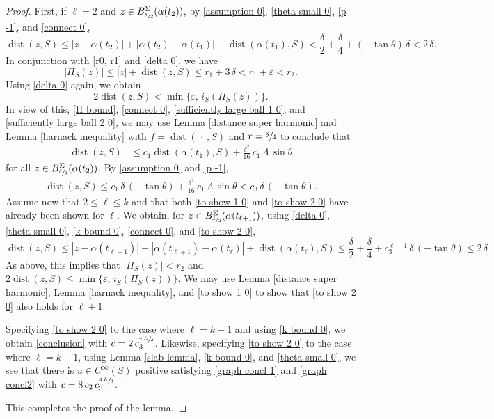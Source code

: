 \documentclass[11pt]{amsart}
\begin{document}
\begin{proof}
		First, if $\ell=2$ and $z\in B^\Sigma_{\sfrac{\delta}{2}}(\alpha(t_2))$, by  \eqref{assumption 0},  \eqref{theta small 0}, \eqref{p -1},  and \eqref{connect 0}, 
		$$
		\operatorname{dist}(z,S)\leq |z-\alpha(t_2)|+|\alpha(t_2)-\alpha(t_1)|+\operatorname{dist}(\alpha(t_1),S)<  	\frac{\delta}{2}+\frac{\delta}{4}	
		+(-\tan\theta)\,\delta<2\,\delta.
		$$
		In conjunction with \eqref{r0, r1} and \eqref{delta 0}, we have 
		$$
		|\Pi_S(z)|\leq|z|+\operatorname{dist}(z,S)\leq r_1+3\,\delta<r_1+\varepsilon<r_2.
		$$
		Using \eqref{delta 0} again, we obtain
		$$ 
			2\operatorname{dist}(z,S)< \min\{\varepsilon,\,i_S(\Pi_S(z))\}.
			$$
		In view of this, \eqref{H bound}, \eqref{connect 0}, \eqref{sufficiently large ball 1 0}, and \eqref{sufficiently large ball 2 0}, we may use Lemma \ref{distance super harmonic} and Lemma \ref{harnack inequality} with $f=\operatorname{dist}(\,\cdot\,,S)$ and $r=\sfrac{\delta}{4}$ to conclude that
			\begin{align*} 
			\operatorname{dist}(z,S)&\leq c_1\operatorname{dist}(\alpha(t_1),S)+\frac{\delta^2}{16}\,c_1\,\Lambda\,\sin\theta
			\end{align*} 
		 for all $z\in B^\Sigma_{\sfrac{\delta}{4}}(\alpha(t_2))$.  By \eqref{assumption 0} and \eqref{p -1}, 
		\begin{align*} 
	\operatorname{dist}(z,S)\leq c_1\,\delta\,(-\tan\theta)+\frac{\delta^2}{16}\,c_1\,\Lambda\,\sin\theta
	< c_3\,\delta\,(-\tan\theta).
		\end{align*} 
		Assume now that $2\leq \ell\leq k$ and that both \eqref{to show 1 0} and \eqref{to show 2 0} have already been shown for $\ell$. We obtain, for  $z\in B^\Sigma_{\sfrac{\delta}{2}}(\alpha(t_{\ell+1}))$, using  \eqref{delta 0}, \eqref{theta small 0}, \eqref{k bound 0}, \eqref{connect 0}, and \eqref{to show 2 0},  
		$$
		\operatorname{dist}(z,S)\leq |z-\alpha(t_{\ell+1})|+|\alpha(t_{\ell+1})-\alpha(t_{\ell})|+\operatorname{dist}(\alpha(t_{\ell}),S)\leq \frac\delta2+\frac\delta 4+c_3^{\ell-1}\,\delta\,(-\tan\theta)\leq 2\,\delta 
		$$
		As above, this implies that $|\Pi_S(z)|<r_2$ and $2\operatorname{dist}(z,S)\leq \min\{\varepsilon,\,i_S(\Pi_S(z))\}$.  
		We may use Lemma \ref{distance super harmonic}, Lemma \ref{harnack inequality}, and \eqref{to show 1 0} to show that \eqref{to show 2 0} also holds for $\ell+1$. 
		
		Specifying \eqref{to show 2 0} to the case where $\ell=k+1$ and using \eqref{k bound 0}, we obtain \eqref{conclusion} with $c=2\,c_3^{\sfrac{4\,L}{\delta}}$. Likewise, specifying \eqref{to show 2 0} to the case where $\ell=k+1$, using Lemma \ref{slab lemma}, \eqref{k bound 0}, and \eqref{theta small 0}, we see that there is  $u\in C^\infty(S)$ positive satisfying \eqref{graph concl 1} and \eqref{graph concl2} with $c=8\,c_2\,c_3^{\sfrac{4\,L}{\delta}}$.
		
	
		
		
		This completes the proof of the lemma.
		

	\end{proof}
\end{document}
